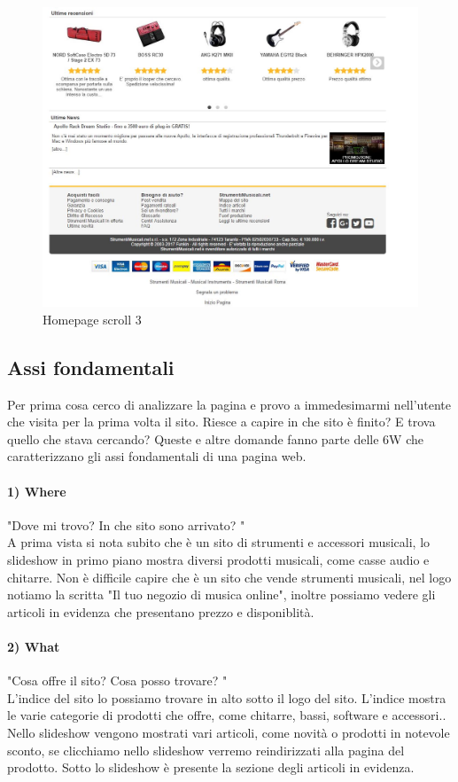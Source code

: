\documentclass[12pt]{article}
\begin{document}
	\begin{figure}
		\centering	
		\includegraphics[width=150mm]{images/home3.png}%
		\caption{Homepage scroll 3}
	\end{figure}
	\newpage
	\subsection{Assi fondamentali}
	\vspace{0.5cm}
	Per prima cosa cerco di analizzare la pagina e provo a immedesimarmi nell'utente che visita per la prima volta il sito. Riesce a capire in che sito è finito? E trova quello che stava cercando?  Queste e altre domande fanno parte delle 6W che caratterizzano gli assi fondamentali di una pagina web.
	\paragraph{1) Where} "Dove mi trovo? In che sito sono arrivato? "
	\\ 
	A prima vista si nota subito che è un sito di strumenti e accessori musicali, lo slideshow in primo piano mostra diversi prodotti musicali, come casse audio e chitarre. Non è difficile capire che è un sito che vende strumenti musicali, nel logo notiamo la scritta "Il tuo negozio di musica online", inoltre possiamo vedere gli articoli in evidenza che presentano prezzo e disponiblità.
	\paragraph{2) What} "Cosa offre il sito? Cosa posso trovare? "
	\\
	L'indice del sito lo possiamo trovare in alto sotto il logo del sito. L'indice mostra le varie categorie di prodotti che offre, come chitarre, bassi, software e accessori.. \\ Nello slideshow vengono mostrati vari articoli, come novità o prodotti in notevole sconto, se clicchiamo nello slideshow verremo reindirizzati alla pagina del prodotto. Sotto lo slideshow è presente la sezione degli articoli in evidenza.
\end{document}
